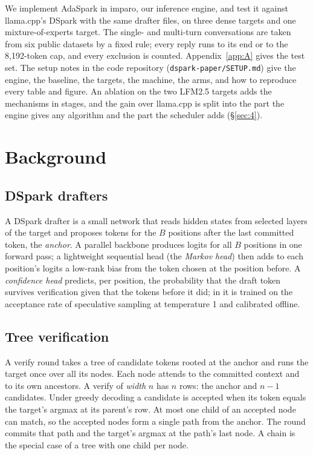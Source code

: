 \documentclass[10pt,twocolumn,letterpaper]{article}
\begin{document}
We implement AdaSpark in imparo, our inference engine, and test it against llama.cpp's DSpark with the same drafter files, on three dense targets and one mixture-of-experts target. The single- and multi-turn conversations are taken from six public datasets by a fixed rule; every reply runs to its end or to the 8,192-token cap, and every exclusion is counted. Appendix~\ref{app:A} gives the test set. The setup notes in the code repository (\texttt{dspark-paper/SETUP.md}) give the engine, the baseline, the targets, the machine, the arms, and how to reproduce every table and figure. An ablation on the two LFM2.5 targets adds the mechanisms in stages, and the gain over llama.cpp is split into the part the engine gives any algorithm and the part the scheduler adds (\S\ref{sec:4}).

\section{Background}\label{sec:2}

\subsection{DSpark drafters}\label{sec:2.1}

A DSpark drafter \cite{cheng2026dspark} is a small network that reads hidden states from selected layers of the target and proposes tokens for the $B$ positions after the last committed token, the \emph{anchor}. A parallel backbone produces logits for all $B$ positions in one forward pass; a lightweight sequential head (the \emph{Markov head}) then adds to each position's logits a low-rank bias from the token chosen at the position before. A \emph{confidence head} predicts, per position, the probability that the draft token survives verification given that the tokens before it did; in \cite{cheng2026dspark} it is trained on the acceptance rate of speculative sampling at temperature 1 and calibrated offline.

\subsection{Tree verification}\label{sec:2.2}

A verify round takes a tree of candidate tokens rooted at the anchor and runs the target once over all its nodes. Each node attends to the committed context and to its own ancestors. A verify of \emph{width} $n$ has $n$ rows: the anchor and $n - 1$ candidates. Under greedy decoding a candidate is accepted when its token equals the target's argmax at its parent's row. At most one child of an accepted node can match, so the accepted nodes form a single path from the anchor. The round commits that path and the target's argmax at the path's last node. A chain is the special case of a tree with one child per node.
\end{document}
